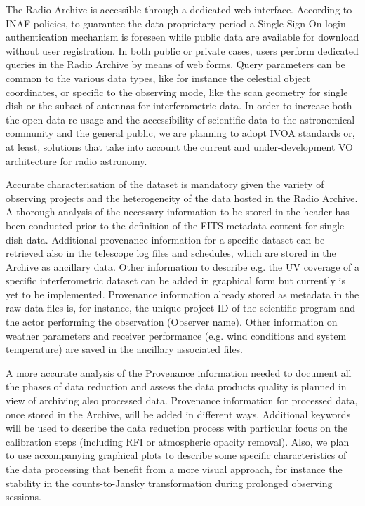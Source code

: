 \documentclass[11pt,a4paper]{ivoa}
\begin{document}
The Radio Archive is accessible through a dedicated web interface. According to INAF policies, to 
guarantee the data proprietary period a Single-Sign-On login authentication mechanism is foreseen while 
public data are available for download without user registration. In both public or private cases, users 
perform dedicated queries in the Radio Archive by means of web forms. Query parameters can be common to 
the various data types, like for instance the celestial object coordinates, or specific to the observing 
mode, like the scan geometry for single dish or the subset of antennas for interferometric data. In 
order to increase both the open data re-usage and the accessibility of scientific data to the 
astronomical community and the general public, we are planning to adopt IVOA standards or, at least, 
solutions that take into account the current and under-development VO architecture for radio astronomy.

Accurate characterisation of the dataset is mandatory given the variety of observing projects and the 
heterogeneity of the data hosted in the Radio Archive. A thorough analysis of the necessary information 
to be stored in the header has been conducted prior to the definition of the FITS metadata content for 
single dish data. Additional provenance information for a specific dataset can be retrieved also in the 
telescope log files and schedules, which are stored in the Archive as ancillary data. Other information 
to describe e.g. the UV coverage of a specific interferometric dataset can be added in graphical form 
but currently is yet to be implemented. Provenance information already stored as metadata in the raw 
data files is, for instance, the unique project ID of the scientific program and the actor performing 
the observation (Observer name). Other information on weather parameters and receiver performance (e.g. 
wind conditions and system temperature) are saved in the ancillary associated files.

A more accurate analysis of the Provenance information needed to document all the phases of data 
reduction and assess the data products quality is planned in view of archiving also processed data.  
Provenance information for processed data, once stored in the Archive, will be added in different ways. 
Additional keywords will be used to describe the data reduction process with particular focus on the 
calibration steps (including RFI or atmospheric opacity removal). Also, we plan to use accompanying 
graphical plots to describe some specific characteristics of the data processing that benefit from a 
more visual approach, for instance the stability in the counts-to-Jansky transformation during prolonged 
observing sessions.
\end{document}
